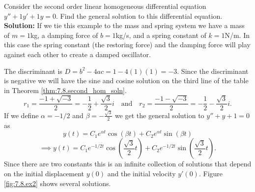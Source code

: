 \begin{example}\label{ex:7.8.ex2}
Consider the second order linear homogeneous differential equation $y'' + 1y' + 1y = 0$.
Find the general solution to this differential equation.
\\{\bf Solution:}
If we tie this example to the mass and spring system we have a mass of $m=1$kg, a damping
force of $b=1$kg/s, and a spring constant of $k=1$N/m.  In this case the spring constant
(the restoring force) and the damping force will play against each other to create a
damped oscillator.

The discriminant is $D = b^2-4ac = 1-4(1)(1)=-3$.  Since the discriminant is negative we
will have the sine and cosine solution on the third line of the table in Theorem
\ref{thm:7.8.second_hom_soln}.
\[ r_1 = \frac{-1 + \sqrt{-3}}{2} = -\frac{1}{2} + \frac{\sqrt{3}}{2} i \quad \text{and}
    \quad r_2 = \frac{-1-\sqrt{-3}}{2} = -\frac{1}{2} - \frac{\sqrt{3}}{2} i.\]
    If we define $\alpha = -1/2$ and $\beta = -\frac{\sqrt{3}}{2}$ we get the general solution to $y''+y+1=0$
as
\[ y(t) = C_1 e^{\alpha t} \cos(\beta t) + C_2 e^{\alpha t} \sin(\beta t) \]
\[\implies  y(t) = C_1 e^{-1/2 t} \cos\left( \frac{\sqrt{3}}{2} t \right) + C_2 e^{-1/2 t} \sin
    \left( \frac{\sqrt{3}}{2} t \right). \]
Since there are two constants this is an infinite collection of solutions that depend on
the initial displacement $y(0)$ and the initial velocity $y'(0)$. Figure \ref{fig:7.8.ex2}
shows several solutions.

\end{example}


